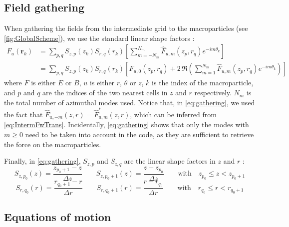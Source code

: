 \documentclass[1p,times,authoryear]{elsarticle}
\renewcommand{\vec}[1]{\boldsymbol{#1}}
\begin{document}
\subsection{Field gathering}

When gathering the fields from the intermediate grid to the
macroparticles (see \cref{fig:GlobalScheme}),
we use the standard linear shape factors :
\begin{align} 
F_u(\vec{r}_k) &=  \sum_{p,q} S_{z,p}(z_k)S_{r,q}(r_k) \left[ \sum_{m=-N_m}^{N_m} \hat{F}_{u,m}(z_p, r_q)
  e^{-im\theta_k} \right] \\
& = \sum_{p,q} S_{z,p}(z_k)S_{r,q}(r_k) \left[ \hat{F}_{u,0}(z_p,
  r_q) + 2\,\Re \left( \sum_{m=1}^{N_m} \hat{F}_{u,m}(z_p, r_q)
  e^{-im\theta_k} \right) \right] \label{eq:gathering}
\end{align}
where $F$ is either $E$ or $B$, $u$ is either $r$, $\theta$ or $z$, $k$ is the index of the macroparticle,
and $p$ and $q$ are the indices of the two nearest cells in $z$ and
$r$ respectively. $N_m$ is the total number
of azimuthal modes used. Notice that, in \cref{eq:gathering}, we used the fact that
$\hat{F}_{u,-m}(z,r) = \hat{F}^*_{u,m}(z,r) $, which can be
inferred from \cref{eq:IntermFwTrans}. Incidentally, \cref{eq:gathering} shows that only the modes
with $m\geq 0$ need to be taken into account in the code, as they are 
sufficient to retrieve the force on the macroparticles.

Finally, in \cref{eq:gathering}, $S_{z,p}$ and $S_{z,q}$ are the linear
shape factors in $z$ and $r$ :
\[ S_{z,p_0}(z) = \frac{z_{p_0+1}- z}{\Delta z}  \qquad 
S_{z,p_0 +1}(z) = \frac{ z - z_{p_0} }{\Delta z} \qquad
\mathrm{with} \quad z_{p_0} \leq z < z_{p_0 +1}  \]
\[ S_{r,q_0}(r) = \frac{ r_{q_0+1} - r }{  \Delta r }
\qquad S_{r,q_0+1}(r) = \frac{ r - r_{q_0} }{  \Delta r }
\qquad \mathrm{with} \quad r_{q_0} \leq r < r_{q_0+1}
 \]

\subsection{Equations of motion}
\end{document}
